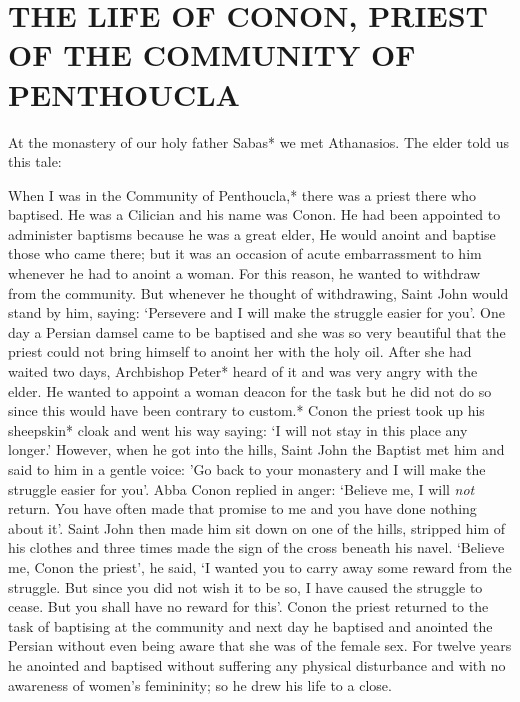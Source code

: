 \chapter{THE LIFE OF CONON, PRIEST OF THE COMMUNITY OF PENTHOUCLA}

At the monastery of our holy father Sabas* we met Athanasios.
The elder told us this tale:

When I was in the Community of Penthoucla,* there was a priest there who baptised.
He was a Cilician and his name was Conon.
He had been appointed to administer baptisms because he was a great elder, He would anoint and baptise those who came there;
but it was an occasion of acute embarrassment to him whenever he had to anoint a woman.
For this reason, he wanted to withdraw from the community.
But whenever he thought of withdrawing, Saint John would stand by him, saying: `Persevere and I will make the struggle easier for you'.
One day a Persian damsel came to be baptised and she was so very beautiful that the priest could not bring himself to anoint her with the holy oil.
After she had waited two days, Archbishop Peter* heard of it and was very angry with the elder.
He wanted to appoint a woman deacon for the task but he did not do
so since this would have been contrary to custom.*
Conon the priest took up his sheepskin* cloak and went his way saying: `I will not stay in this place any longer.'
However, when he got into the hills, Saint John the Baptist met him and said to him in a gentle voice: 'Go back to your monastery and I will make the struggle easier for you'.
Abba Conon replied in anger: `Believe me, I will \textit{not} return.
You have often made that promise to me and you have done nothing about it'.
Saint John then made him sit down on one of the hills, stripped him of his clothes and three times made the sign of the cross beneath his navel.
`Believe me, Conon the priest', he said, `I wanted you to carry away some reward from the struggle.
But since you did not wish it to be so, I have caused the struggle to cease.
But you shall have no reward for this'.
Conon the priest returned to the task of baptising at the community and next day he baptised and anointed the Persian without even being aware that she was of the female sex.
For twelve years he anointed and baptised without suffering any physical disturbance and with no awareness of women's femininity;
so he drew his life to a close.

